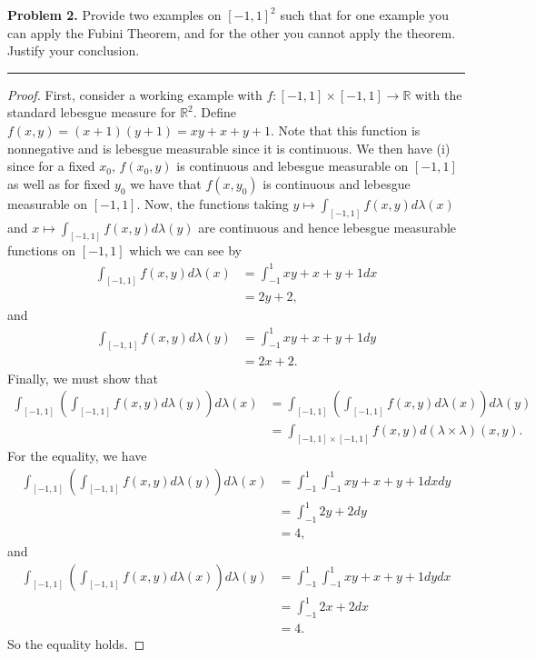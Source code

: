 \documentclass[leqno]{article}
\theoremstyle{nonumberplain}
\newtheorem{proof}{Proof}
\newcommand{\R}{\mathbb{R}}
\begin{document}
\pagebreak



\noindent\textbf{Problem 2.} \quad
Provide two examples on $[-1,1]^2$ such that for one example you can apply the Fubini Theorem, and for the other you cannot apply the theorem. Justify your conclusion.


\noindent\rule[0.5ex]{\linewidth}{1pt}


\begin{proof}
First, consider a working example with $f\colon [-1,1]\times [-1,1] \to \R$ with the standard lebesgue measure for $\R^2$.  Define $f(x,y)=(x+1)(y+1)=xy+x+y+1$.  Note that this function is nonnegative and is lebesgue measurable since it is continuous.  We then have (i) since for a fixed $x_0$, $f(x_0,y)$ is continuous and lebesgue measurable on $[-1,1]$ as well as for fixed $y_0$ we have that $f(x,y_0)$ is continuous and lebesgue measurable on $[-1,1]$.  Now, the functions taking $y\mapsto \int_{[-1,1]} f(x,y)d\lambda(x)$ and $x\mapsto \int_{[-1,1]} f(x,y)d\lambda (y)$ are continuous and hence lebesgue measurable functions on $[-1,1]$ which we can see by
\begin{align*}
\int_{[-1,1]} f(x,y)d\lambda (x) &= \int_{-1}^1 xy+x+y+1 dx\\
&= 2y+2,
\end{align*}
and
\begin{align*}
\int_{[-1,1]} f(x,y)d\lambda(y)&= \int_{-1}^1 xy+x+y+1 dy\\
&= 2x+2.
\end{align*}
Finally, we must show that
\begin{align*}
\int_{[-1,1]}\left( \int_{[-1,1]} f(x,y) d\lambda(y)\right) d\lambda(x)&=\int_{[-1,1]}\left( \int_{[-1,1]} f(x,y) d\lambda(x)\right) d\lambda(y)\\
&= \int_{[-1,1]\times [-1,1]}f(x,y) d (\lambda\times \lambda)(x,y).
\end{align*}
For the equality, we have
\begin{align*}
\int_{[-1,1]}\left( \int_{[-1,1]} f(x,y) d\lambda(y)\right) d\lambda(x)&= \int_{-1}^1 \int_{-1}^1 xy+x+y+1 dxdy\\
&= \int_{-1}^1 2y+2 dy\\
&=4,
\end{align*}
and
\begin{align*}
\int_{[-1,1]}\left( \int_{[-1,1]} f(x,y) d\lambda(x)\right) d\lambda(y)&= \int_{-1}^1 \int_{-1}^1 xy+x+y+1 dydx\\
&= \int_{-1}^1 2x+2 dx\\
&=4.
\end{align*}
So the equality holds.


\end{proof}
\end{document}
